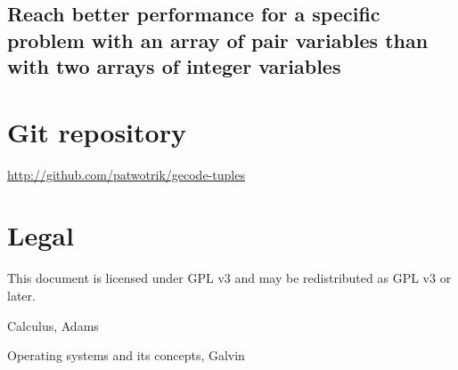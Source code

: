 \documentclass[a4paper,11pt]{article}
\begin{document}
\subsection{Reach better performance for a specific problem with an array of pair variables than with two arrays of integer variables}

\section{Git repository}
\url{http://github.com/patwotrik/gecode-tuples}

\section{Legal}
This document is licensed under GPL v3 and may be redistributed as GPL v3 or later. 


\begin{thebibliography}{99}
	Calculus, 
	Adams
	
	Operating systems and its concepts,
	Galvin
	
\end{thebibliography}
\end{document}
